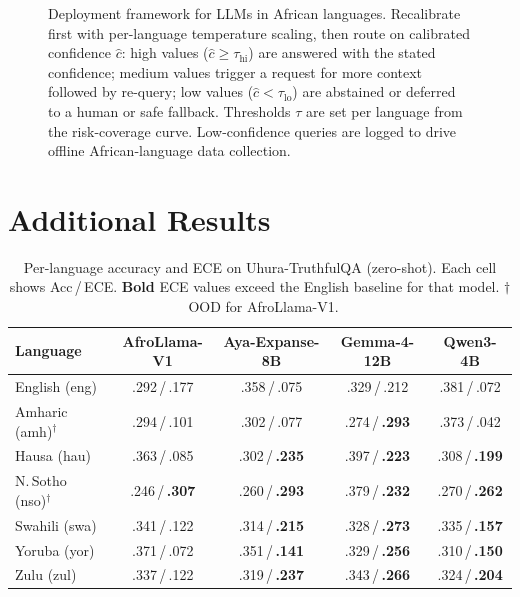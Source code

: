 \documentclass[11pt,a4paper]{article}
\begin{document}
\begin{figure}[H]
\caption{%
  Deployment framework for LLMs in African languages. Recalibrate first with
  per-language temperature scaling, then route on calibrated confidence $\hat{c}$:
  high values ($\hat{c} \geq \tau_{\mathrm{hi}}$) are answered with the stated
  confidence; medium values trigger a request for more context followed by
  re-query; low values ($\hat{c} < \tau_{\mathrm{lo}}$) are abstained or
  deferred to a human or safe fallback. Thresholds $\tau$ are set per language
  from the risk-coverage curve. Low-confidence queries are logged to drive
  offline African-language data collection.
}
\label{fig:deployment}
\end{figure}

\section{Additional Results}
\label{app:per_lang}

\begin{table}[H]
\centering
\caption{Per-language accuracy and ECE on Uhura-TruthfulQA (zero-shot).
  Each cell shows Acc\,/\,ECE. \textbf{Bold} ECE values exceed the English
  baseline for that model. $\dagger$~OOD for AfroLlama-V1.}
\label{tab:uhura_lang}
\small
\begin{tabular}{lcccc}
\toprule
\textbf{Language} & \textbf{AfroLlama-V1} & \textbf{Aya-Expanse-8B}
                  & \textbf{Gemma-4-12B}  & \textbf{Qwen3-4B} \\
\midrule
English (eng)         & .292\,/\,.177 & .358\,/\,.075 & .329\,/\,.212 & .381\,/\,.072 \\
\midrule
Amharic (amh)$^\dagger$ & .294\,/\,.101 & .302\,/\,.077 & .274\,/\,\textbf{.293} & .373\,/\,.042 \\
Hausa (hau)           & .363\,/\,.085 & .302\,/\,\textbf{.235} & .397\,/\,\textbf{.223} & .308\,/\,\textbf{.199} \\
N.\,Sotho (nso)$^\dagger$ & .246\,/\,\textbf{.307} & .260\,/\,\textbf{.293} & .379\,/\,\textbf{.232} & .270\,/\,\textbf{.262} \\
Swahili (swa)         & .341\,/\,.122 & .314\,/\,\textbf{.215} & .328\,/\,\textbf{.273} & .335\,/\,\textbf{.157} \\
Yoruba (yor)          & .371\,/\,.072 & .351\,/\,\textbf{.141} & .329\,/\,\textbf{.256} & .310\,/\,\textbf{.150} \\
Zulu (zul)            & .337\,/\,.122 & .319\,/\,\textbf{.237} & .343\,/\,\textbf{.266} & .324\,/\,\textbf{.204} \\
\bottomrule
\end{tabular}
\end{table}
\end{document}
